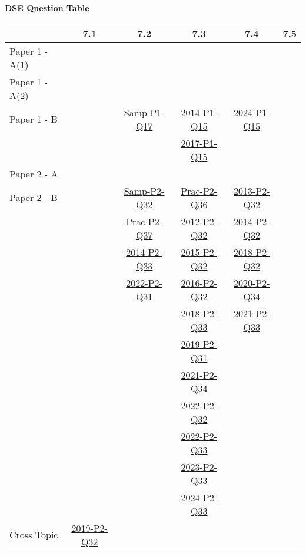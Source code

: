 \documentclass[12pt, a4paper]{article}
\begin{document}
\begin{absolutelynopagebreak}
\begin{center}
\textbf{DSE Question Table}
\end{center}
\begin{center}
\begin{tabular}{|l|c|c|c|c|c|}
\hline
        & 7.1 & 7.2 & 7.3 & 7.4 & 7.5 \\\hline
\hline
Paper 1 - A(1)&  &  &  &  &  \\
\hline
Paper 1 - A(2)&  &  &  &  &  \\
\hline
Paper 1 - B&  & \hyperref[DSE2012S-CoreP1-Q17]{Samp-P1-Q17} & \hyperref[DSE2014-CoreP1-Q15]{2014-P1-Q15} & \hyperref[DSE2024-CoreP1-Q15]{2024-P1-Q15} &  \\
&  &  & \hyperref[DSE2017-CoreP1-Q15]{2017-P1-Q15} &  &  \\
\hline
\hline
Paper 2 - A&  &  &  &  &  \\
\hline
Paper 2 - B&  & \hyperref[DSE2012S-CoreP2-Q32]{Samp-P2-Q32} & \hyperref[DSE2012P-CoreP2-Q36]{Prac-P2-Q36} & \hyperref[DSE2013-CoreP2-Q32]{2013-P2-Q32} &  \\
&  & \hyperref[DSE2012P-CoreP2-Q37]{Prac-P2-Q37} & \hyperref[DSE2012-CoreP2-Q32]{2012-P2-Q32} & \hyperref[DSE2014-CoreP2-Q32]{2014-P2-Q32} &  \\
&  & \hyperref[DSE2014-CoreP2-Q33]{2014-P2-Q33} & \hyperref[DSE2015-CoreP2-Q32]{2015-P2-Q32} & \hyperref[DSE2018-CoreP2-Q32]{2018-P2-Q32} &  \\
&  & \hyperref[DSE2022-CoreP2-Q31]{2022-P2-Q31} & \hyperref[DSE2016-CoreP2-Q32]{2016-P2-Q32} & \hyperref[DSE2020-CoreP2-Q34]{2020-P2-Q34} &  \\
&  &  & \hyperref[DSE2018-CoreP2-Q33]{2018-P2-Q33} & \hyperref[DSE2021-CoreP2-Q33]{2021-P2-Q33} &  \\
&  &  & \hyperref[DSE2019-CoreP2-Q31]{2019-P2-Q31} &  &  \\
&  &  & \hyperref[DSE2021-CoreP2-Q34]{2021-P2-Q34} &  &  \\
&  &  & \hyperref[DSE2022-CoreP2-Q32]{2022-P2-Q32} &  &  \\
&  &  & \hyperref[DSE2022-CoreP2-Q33]{2022-P2-Q33} &  &  \\
&  &  & \hyperref[DSE2023-CoreP2-Q33]{2023-P2-Q33} &  &  \\
&  &  & \hyperref[DSE2024-CoreP2-Q33]{2024-P2-Q33} &  &  \\
\hline
\hline
Cross Topic& \hyperref[DSE2019-CoreP2-Q32]{2019-P2-Q32} &  &  &  &  \\
\hline
\end{tabular}
\end{center}
\end{absolutelynopagebreak}
\end{document}
